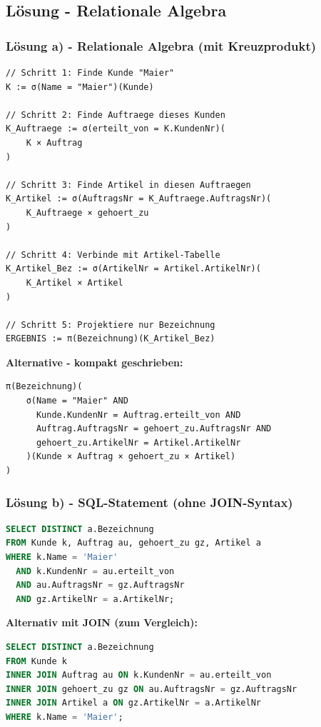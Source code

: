 \documentclass[a4paper]{article}
\begin{document}
\subsection{Lösung - Relationale Algebra}

\subsubsection{Lösung a) - Relationale Algebra (mit Kreuzprodukt)}

\begin{lstlisting}
// Schritt 1: Finde Kunde "Maier"
K := σ(Name = "Maier")(Kunde)

// Schritt 2: Finde Auftraege dieses Kunden
K_Auftraege := σ(erteilt_von = K.KundenNr)(
    K × Auftrag
)

// Schritt 3: Finde Artikel in diesen Auftraegen
K_Artikel := σ(AuftragsNr = K_Auftraege.AuftragsNr)(
    K_Auftraege × gehoert_zu
)

// Schritt 4: Verbinde mit Artikel-Tabelle
K_Artikel_Bez := σ(ArtikelNr = Artikel.ArtikelNr)(
    K_Artikel × Artikel
)

// Schritt 5: Projektiere nur Bezeichnung
ERGEBNIS := π(Bezeichnung)(K_Artikel_Bez)
\end{lstlisting}

\textbf{Alternative - kompakt geschrieben:}

\begin{lstlisting}
π(Bezeichnung)(
    σ(Name = "Maier" AND 
      Kunde.KundenNr = Auftrag.erteilt_von AND
      Auftrag.AuftragsNr = gehoert_zu.AuftragsNr AND
      gehoert_zu.ArtikelNr = Artikel.ArtikelNr
    )(Kunde × Auftrag × gehoert_zu × Artikel)
)
\end{lstlisting}

\subsubsection{Lösung b) - SQL-Statement (ohne JOIN-Syntax)}

\begin{lstlisting}[language=sql]
SELECT DISTINCT a.Bezeichnung
FROM Kunde k, Auftrag au, gehoert_zu gz, Artikel a
WHERE k.Name = 'Maier'
  AND k.KundenNr = au.erteilt_von
  AND au.AuftragsNr = gz.AuftragsNr
  AND gz.ArtikelNr = a.ArtikelNr;
\end{lstlisting}

\textbf{Alternativ mit JOIN (zum Vergleich):}

\begin{lstlisting}[language=sql]
SELECT DISTINCT a.Bezeichnung
FROM Kunde k
INNER JOIN Auftrag au ON k.KundenNr = au.erteilt_von
INNER JOIN gehoert_zu gz ON au.AuftragsNr = gz.AuftragsNr
INNER JOIN Artikel a ON gz.ArtikelNr = a.ArtikelNr
WHERE k.Name = 'Maier';
\end{lstlisting}
\end{document}
